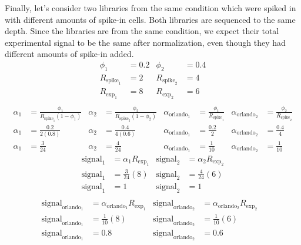 Finally, let's consider two libraries from the same condition which were spiked in with different amounts of spike-in cells. Both libraries are sequenced to the same depth. Since the libraries are from the same condition, we expect their total experimental signal to be the same after normalization, even though they had different amounts of spike-in added.
\begin{align*}
    \phi_1 &= 0.2 & \phi_2 &=0.4 \\
    R_{\text{spike}_1} &= 2 & R_{\text{spike}_2} &= 4 \\
    R_{\text{exp}_1} &= 8 & R_{\text{exp}_2} &= 6 \\
\end{align*}
\begin{align*}
    \alpha_1 &= \frac{\phi_1}{R_{\text{spike}_1} \left(1-\phi_1 \right)} &
    \alpha_2 &= \frac{\phi_2}{R_{\text{spike}_2} \left(1-\phi_2 \right)} &
    \alpha_{\text{orlando}_1} &= \frac{\phi_1}{R_{\text{spike}_1}} &
    \alpha_{\text{orlando}_2} &= \frac{\phi_2}{R_{\text{spike}_2}} \\
    \alpha_1 &= \frac{0.2}{2 \left(0.8 \right)} &
    \alpha_2 &= \frac{0.4}{4 \left(0.6 \right)} &
    \alpha_{\text{orlando}_1} &= \frac{0.2}{2} &
    \alpha_{\text{orlando}_2} &= \frac{0.4}{4} \\
    \alpha_1 &= \frac{3}{24} &
    \alpha_2 &= \frac{4}{24} &
    \alpha_{\text{orlando}_1} &= \frac{1}{10} &
    \alpha_{\text{orlando}_2} &= \frac{1}{10}
\end{align*}
\begin{align*}
    \text{signal}_1 &= \alpha_1 R_{\text{exp}_1}  &
    \text{signal}_2 &= \alpha_2 R_{\text{exp}_2}  \\
    \text{signal}_1 &=  \frac{3}{24} \left(8 \right)  &
    \text{signal}_2 &=  \frac{4}{24} \left(6 \right)  \\
    \text{signal}_1 &=  1 &
    \text{signal}_2 &=  1 \\
\end{align*}
\begin{align*}
    \text{signal}_{\text{orlando}_1} &= \alpha_{\text{orlando}_1} R_{\text{exp}_1} &
    \text{signal}_{\text{orlando}_2} &= \alpha_{\text{orlando}_2} R_{\text{exp}_2} & \\
    \text{signal}_{\text{orlando}_1} &= \frac{1}{10} \left(8\right) &
    \text{signal}_{\text{orlando}_2} &= \frac{1}{10} \left(6\right) & \\
    \text{signal}_{\text{orlando}_1} &= 0.8 &
    \text{signal}_{\text{orlando}_2} &= 0.6 \\
\end{align*}
